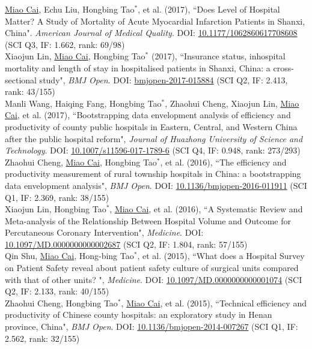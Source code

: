 \documentclass[11pt, a4paper]{article}
\newcommand{\years}[1]{\marginnote{\scriptsize #1}}
\begin{document}
\years{2017}\underline{Miao Cai}, Echu Liu, Hongbing Tao$^\ast$, et al. (2017), ``Does Level of Hospital Matter? A Study of Mortality of Acute Myocardial Infarction Patients in Shanxi, China". \emph{American Journal of Medical Quality}. DOI: \href{https://doi.org/10.1177/1062860617708608}{10.1177/1062860617708608} (SCI Q3, IF: 1.662, rank: 69/98)\\
\years{2017}Xiaojun Lin, \underline{Miao Cai}, Hongbing Tao$^\ast$ (2017), ``Insurance status, inhospital mortality and length of stay in hospitalised patients in Shanxi, China: a cross-sectional study", \emph{BMJ Open}. DOI: \href{https://doi.org/10.1136/bmjopen-2017-015884}{bmjopen-2017-015884} (SCI Q2, IF: 2.413, rank: 43/155)\\
\years{2017}Manli Wang, Haiqing Fang, Hongbing Tao$^\ast$, Zhaohui Cheng, Xiaojun Lin, \underline{Miao Cai}, et al. (2017), ``Bootstrapping data envelopment analysis of efficiency and productivity of county public hospitals in Eastern, Central, and Western China after the public hospital reform", \emph{Journal of Huazhong University of Science and Technology}. DOI: \href{https://doi.org/10.1007/s11596-017-1789-6}{10.1007/s11596-017-1789-6} (SCI Q4, IF: 0.948, rank: 273/293)\\
\years{2016}Zhaohui Cheng, \underline{Miao Cai}, Hongbing Tao$^\ast$, et al. (2016), ``The efficiency and productivity measurement of rural township hospitals in China: a bootstrapping data envelopment analysis", \emph{BMJ Open}. DOI: \href{https://doi.org/10.1136/bmjopen-2016-011911}{10.1136/bmjopen-2016-011911} (SCI Q1, IF: 2.369, rank: 38/155)\\
\years{2016}Xiaojun Lin, Hongbing Tao$^\ast$, \underline{Miao Cai}, et al. (2016), ``A Systematic Review and Meta-analysis of the Relationship Between Hospital Volume and Outcome for Percutaneous Coronary Intervention", \emph{Medicine}. DOI: \href{https://doi.org/10.1097/MD.0000000000002687}{10.1097/MD.0000000000002687} (SCI Q2, IF: 1.804, rank: 57/155)\\
\years{2015}Qin Shu, \underline{Miao Cai}, Hong-bing Tao$^\ast$, et al. (2015), ``What does a Hospital Survey on Patient Safety reveal about patient safety culture of surgical units compared with that of other units? ", \emph{Medicine}. DOI: \href{https://doi.org/10.1097/MD.0000000000001074}{10.1097/MD.0000000000001074} (SCI Q2, IF: 2.133, rank: 40/155)\\
\years{2015}Zhaohui Cheng, Hongbing Tao$^\ast$, \underline{Miao Cai}, et al. (2015), ``Technical efficiency and productivity of Chinese county hospitals: an exploratory study in Henan province, China", \emph{BMJ Open}. DOI: \href{https://doi.org/10.1136/bmjopen-2014-007267}{10.1136/bmjopen-2014-007267} (SCI Q1, IF: 2.562, rank: 32/155)
\end{document}
